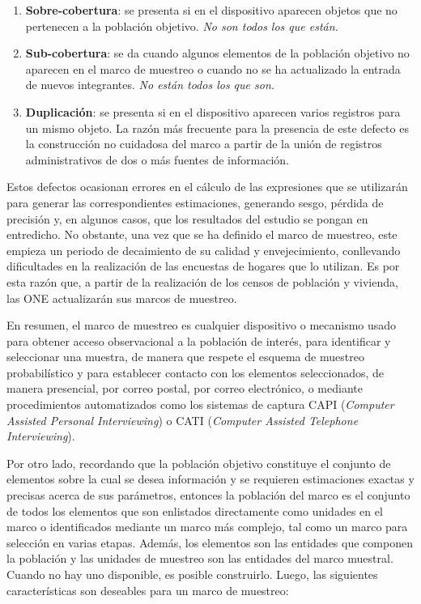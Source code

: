 \documentclass[
  12pt,
]{book}
\providecommand{\tightlist}{%
  \setlength{\itemsep}{0pt}\setlength{\parskip}{0pt}}
\begin{document}
\begin{enumerate}
\def\labelenumi{\arabic{enumi}.}
\tightlist
\item
  \textbf{Sobre-cobertura}: se presenta si en el dispositivo aparecen objetos que no pertenecen a la población objetivo. \emph{No son todos los que están.}
\item
  \textbf{Sub-cobertura}: se da cuando algunos elementos de la población objetivo no aparecen en el marco de muestreo o cuando no se ha actualizado la entrada de nuevos integrantes. \emph{No están todos los que son.}
\item
  \textbf{Duplicación}: se presenta si en el dispositivo aparecen varios registros para un mismo objeto. La razón más frecuente para la presencia de este defecto es la construcción no cuidadosa del marco a partir de la unión de registros administrativos de dos o más fuentes de información.
\end{enumerate}

Estos defectos ocasionan errores en el cálculo de las expresiones que se utilizarán para generar las correspondientes estimaciones, generando sesgo, pérdida de precisión y, en algunos casos, que los resultados del estudio se pongan en entredicho. No obstante, una vez que se ha definido el marco de muestreo, este empieza un periodo de decaimiento de su calidad y envejecimiento, conllevando dificultades en la realización de las encuestas de hogares que lo utilizan. Es por esta razón que, a partir de la realización de los censos de población y vivienda, las ONE actualizarán sus marcos de muestreo.

En resumen, el marco de muestreo es cualquier dispositivo o mecanismo usado para obtener acceso observacional a la población de interés, para identificar y seleccionar una muestra, de manera que respete el esquema de muestreo probabilístico y para establecer contacto con los elementos seleccionados, de manera presencial, por correo postal, por correo electrónico, o mediante procedimientos automatizados como los sistemas de captura CAPI (\emph{Computer Assisted Personal Interviewing}) o CATI (\emph{Computer Assisted Telephone Interviewing}).

Por otro lado, recordando que la población objetivo constituye el conjunto de elementos sobre la cual se desea información y se requieren estimaciones exactas y precisas acerca de sus parámetros, entonces la población del marco es el conjunto de todos los elementos que son enlistados directamente como unidades en el marco o identificados mediante un marco más complejo, tal como un marco para selección en varias etapas. Además, los elementos son las entidades que componen la población y las unidades de muestreo son las entidades del marco muestral. Cuando no hay uno disponible, es posible construirlo. Luego, las siguientes características son deseables para un marco de muestreo:
\end{document}
